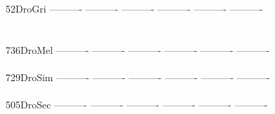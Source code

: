 \documentclass[11pt,twoside,reqno,a4paper]{article}
\begin{document}
{52\hspace*{3\charwidth}DroGri	----------	----------	----------	----------	----------	----------	\\
\hspace*{5\charwidth}\hspace*{7\charwidth}\hspace*{1\charwidth}\hspace*{1\charwidth}\hspace*{1\charwidth}\hspace*{1\charwidth}\hspace*{1\charwidth}\hspace*{1\charwidth}\\
\\
736\hspace*{2\charwidth}DroMel	----------	----------	----------	----------	----------	----------	\\
\hspace*{5\charwidth}\hspace*{7\charwidth}\hspace*{1\charwidth}\hspace*{1\charwidth}\hspace*{1\charwidth}\hspace*{1\charwidth}\hspace*{1\charwidth}\hspace*{1\charwidth}\\
729\hspace*{2\charwidth}DroSim	----------	----------	----------	----------	----------	----------	\\
\hspace*{5\charwidth}\hspace*{7\charwidth}\hspace*{1\charwidth}\hspace*{1\charwidth}\hspace*{1\charwidth}\hspace*{1\charwidth}\hspace*{1\charwidth}\hspace*{1\charwidth}\\
505\hspace*{2\charwidth}DroSec	----------	----------	----------	----------	----------	----------	\\
\hspace*{5\charwidth}\hspace*{7\charwidth}\hspace*{1\charwidth}\hspace*{1\charwidth}\hspace*{1\charwidth}\hspace*{1\charwidth}\hspace*{1\charwidth}\hspace*{1\charwidth}\\
}
\end{document}
